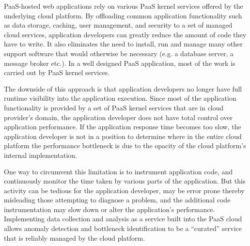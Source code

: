 PaaS-hosted web applications rely on various PaaS kernel services offered by the underlying
cloud platform. By offloading common application functionality such as data storage, caching,
user management, and security to a set of managed cloud services, application developers
can greatly reduce the amount of code they have to write. It also eliminates the need to install, run and
manage many other support software that would otherwise be necessary (e.g. a database server, 
a message broker etc.). In a well designed PaaS application, most of the work is carried out
by PaaS kernel services.

The downside of this approach is that application developers no longer have full runtime visibility
into the application execution. Since most of the application functionality is provided by a set 
of PaaS kernel services that are in cloud provider's domain, the application
developer does not have total control over application performance. If the application 
response time becomes too slow, the application developer is not in a position to determine
where in the entire cloud platform the performance bottleneck is due to the opacity of the cloud
platform's internal implementation. 

One way to circumvent this 
limitation is to instrument application code, and continuously monitor the time taken by various
parts of the application. But this activity can be tedious for the application developer, 
may be error prone thereby misleading those attempting to
diagnose a problem, and
the additional code instrumentation may slow down or alter the application's
performance. 
Implementing data collection and analysis as a service built into the PaaS cloud allows 
anomaly detection and bottleneck identification to be a ``curated'' service that is 
reliably managed by the cloud platform.

